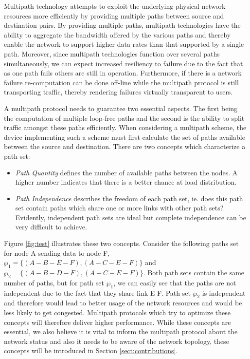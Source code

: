 Multipath technology attempts to exploit the underlying physical network
resources more efficiently by providing multiple paths between source and
destination pairs. By providing multiple paths, multipath technologies have the
ability to aggregate the bandwidth offered by the various paths and thereby
enable the network to support higher data rates than that supported by a
single path. Moreover, since multipath technologies function over several paths
simultaneously, we can expect increased resiliency to failure due to the fact
that as one path fails others are still in operation. Furthermore, if there is a
network failure re-computation can be done off-line while the multipath protocol
is still transporting traffic, thereby rendering failures virtually transparent
to users.

A multipath protocol needs to guarantee two essential aspects. The first being
the computation of multiple loop-free paths and the second is the ability to
split traffic amongst these paths efficiently. When considering a multipath
scheme, the device implementing such a scheme must first calculate the set of
paths available between the source and destination. There are two concepts which
characterize a path set:

\begin{itemize}
 \item \textit{Path Quantity} defines the number of available paths between the
nodes. A higher number indicates that there is a better chance at load
distribution.
 \item \textit{Path Independence} describes the freedom of each path set, ie.
does this path set contain paths which share one or more links with other path
sets? Evidently, independent path sets are ideal but complete independence can
be very difficult to achieve.
\end{itemize}


Figure \ref{fig:test} illustrates these two concepts. Consider the following
paths set for node A sending data to node F, $\wp_1 = \{(A-B-E-F), (A-C-E-F)\}$
and $\wp_2 = \{(A-B-D-F), (A-C-E-F)\}$. Both path sets contain the same number of
paths, but for path set $\wp_1$, we can easily see that the paths are not
independent due to the fact that they share link E-F. Path set $\wp_2$ is
independent and therefore would lead to better usage of the network resources
and would be less likely to get congested. Multipath protocols which try to
optimize these concepts will therefore deliver higher performance. While these
concepts are essential, we also believe it is vital to inform the multipath
protocol about the network status and also it needs to be aware of the network
topology, these concepts will be introduced in Section \ref{sect:contributions}.

